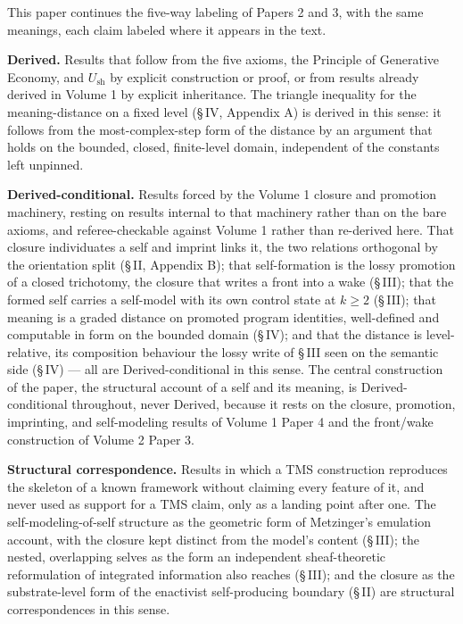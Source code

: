 \documentclass[11pt,oneside]{report}
\theoremstyle{definition}
\theoremstyle{remark}
\begin{document}
This paper continues the five-way labeling of Papers 2 and 3, with the same
meanings, each claim labeled where it appears in the text.

\textbf{Derived.} Results that follow from the five axioms, the Principle of
Generative Economy, and \ensuremath{U_{\mathrm{sh}}} by explicit construction or
proof, or from results already derived in Volume 1 by explicit inheritance. The
triangle inequality for the meaning-distance on a fixed level (\S\,IV, Appendix
A) is derived in this sense: it follows from the most-complex-step form of the
distance by an argument that holds on the bounded, closed, finite-level domain,
independent of the constants left unpinned.

\textbf{Derived-conditional.} Results forced by the Volume 1 closure and
promotion machinery, resting on results internal to that machinery rather than
on the bare axioms, and referee-checkable against Volume 1 rather than
re-derived here. That closure individuates a self and imprint links it, the two
relations orthogonal by the orientation split (\S\,II, Appendix B); that
self-formation is the lossy promotion of a closed trichotomy, the closure that
writes a front into a wake (\S\,III); that the formed self carries a self-model
with its own control state at \ensuremath{k \ge 2} (\S\,III); that meaning is a
graded distance on promoted program identities, well-defined and computable in
form on the bounded domain (\S\,IV); and that the distance is level-relative,
its composition behaviour the lossy write of \S\,III seen on the semantic side
(\S\,IV) --- all are Derived-conditional in this sense. The central
construction of the paper, the structural account of a self and its meaning, is
Derived-conditional throughout, never Derived, because it rests on the closure,
promotion, imprinting, and self-modeling results of Volume 1 Paper 4 and the
front/wake construction of Volume 2 Paper 3.

\textbf{Structural correspondence.} Results in which a TMS construction
reproduces the skeleton of a known framework without claiming every feature of
it, and never used as support for a TMS claim, only as a landing point after
one. The self-modeling-of-self structure as the geometric form of Metzinger's
emulation account, with the closure kept distinct from the model's content
(\S\,III); the nested, overlapping selves as the form an independent
sheaf-theoretic reformulation of integrated information also reaches (\S\,III);
and the closure as the substrate-level form of the enactivist self-producing
boundary (\S\,II) are structural correspondences in this sense.
\end{document}

